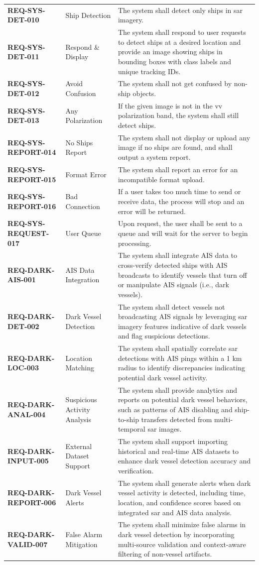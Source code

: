 \documentclass{article}
\begin{document}
\begin{longtable}{>{\bfseries}p{4.5cm}p{3.5cm}p{6.5cm}}
		REQ-SYS-DET-010 & Ship Detection & The system shall detect only ships in \acrshort{sar} imagery. \\
		REQ-SYS-DET-011 & Respond \& Display & The system shall respond to user requests to detect ships at a desired location and provide an image showing ships in bounding boxes with class labels and unique tracking IDs. \\
		REQ-SYS-DET-012 & Avoid Confusion & The system shall not get confused by non-ship objects. \\
		REQ-SYS-DET-013 & Any Polarization & If the given image is not in the \acrshort{vv} polarization band, the system shall still detect ships. \\
		REQ-SYS-REPORT-014 & No Ships Report & The system shall not display or upload any image if no ships are found, and shall output a system report. \\
		REQ-SYS-REPORT-015 & Format Error & The system shall report an error for an incompatible format upload. \\
		REQ-SYS-REPORT-016 & Bad Connection & If a user takes too much time to send or receive data, the process will stop and an error will be returned. \\
		REQ-SYS-REQUEST-017 & User Queue & Upon request, the user shall be sent to a queue and will wait for the server to begin processing. \\
		REQ-DARK-AIS-001 & AIS Data Integration & The system shall integrate AIS data to cross-verify detected ships with AIS broadcasts to identify vessels that turn off or manipulate AIS signals (i.e., dark vessels). \\
		REQ-DARK-DET-002 & Dark Vessel Detection & The system shall detect vessels not broadcasting AIS signals by leveraging \acrshort{sar} imagery features indicative of dark vessels and flag suspicious detections. \\
		REQ-DARK-LOC-003 & Location Matching & The system shall spatially correlate \acrshort{sar} detections with AIS pings within a 1 km radius to identify discrepancies indicating potential dark vessel activity. \\
		REQ-DARK-ANAL-004 & Suspicious Activity Analysis & The system shall provide analytics and reports on potential dark vessel behaviors, such as patterns of AIS disabling and ship-to-ship transfers detected from multi-temporal \acrshort{sar} images. \\
		REQ-DARK-INPUT-005 & External Dataset Support & The system shall support importing historical and real-time AIS datasets to enhance dark vessel detection accuracy and verification. \\
		REQ-DARK-REPORT-006 & Dark Vessel Alerts & The system shall generate alerts when dark vessel activity is detected, including time, location, and confidence scores based on integrated \acrshort{sar} and AIS data analysis. \\
		REQ-DARK-VALID-007 & False Alarm Mitigation & The system shall minimize false alarms in dark vessel detection by incorporating multi-source validation and context-aware filtering of non-vessel artifacts. \\
	\end{longtable}
	
\end{document}
